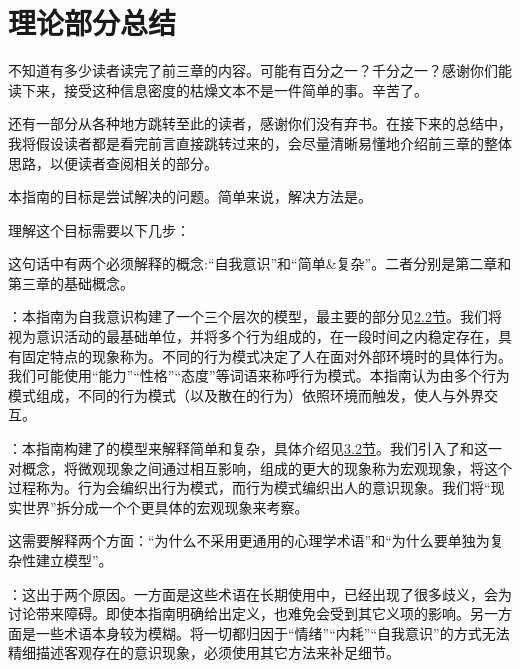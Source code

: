 \chapter{理论部分总结\label{chap:midterm}}

不知道有多少读者读完了前三章的内容。可能有百分之一？千分之一？感谢你们能读下来，接受这种信息密度的枯燥文本不是一件简单的事。辛苦了。

还有一部分从各种地方跳转至此的读者，感谢你们没有弃书。在接下来的总结中，我将假设读者都是看完前言直接跳转过来的，会尽量清晰易懂地介绍前三章的整体思路，以便读者查阅相关的部分。

\divider

本指南的目标是尝试解决的问题。简单来说，解决方法是。

理解这个目标需要以下几步：
\vspace{10pt}

这句话中有两个必须解释的概念:“自我意识”和“简单\&复杂”。二者分别是第二章和第三章的基础概念。

：本指南为自我意识构建了一个三个层次的模型，最主要的部分见\hyperref[sec:意识的层次]{2.2节}。我们将视为意识活动的最基础单位，并将多个行为组成的，在一段时间之内稳定存在，具有固定特点的现象称为。不同的行为模式决定了人在面对外部环境时的具体行为。我们可能使用“能力”“性格”“态度”等词语来称呼行为模式。本指南认为\hyperref[def:意识现象]{}由多个行为模式组成，不同的行为模式（以及散在的行为）依照环境而触发，使人与外界交互。

：本指南构建了的模型来解释简单和复杂，具体介绍见\hyperref[sec:复杂系统]{3.2节}。我们引入了和这一对概念，将微观现象之间通过相互影响，组成的更大的现象称为宏观现象，将这个过程称为。行为会编织出行为模式，而行为模式编织出人的意识现象。我们将“现实世界”拆分成一个个更具体的宏观现象来考察。
\vspace{10pt}

这需要解释两个方面：“为什么不采用更通用的心理学术语”和“为什么要单独为复杂性建立模型”。

：这出于两个原因。一方面是这些术语在长期使用中，已经出现了很多歧义，会为讨论带来障碍。即使本指南明确给出定义，也难免会受到其它义项的影响。另一方面是一些术语本身较为模糊。将一切都归因于“情绪”“内耗”“自我意识”的方式无法精细描述客观存在的意识现象，必须使用其它方法来补足细节。


